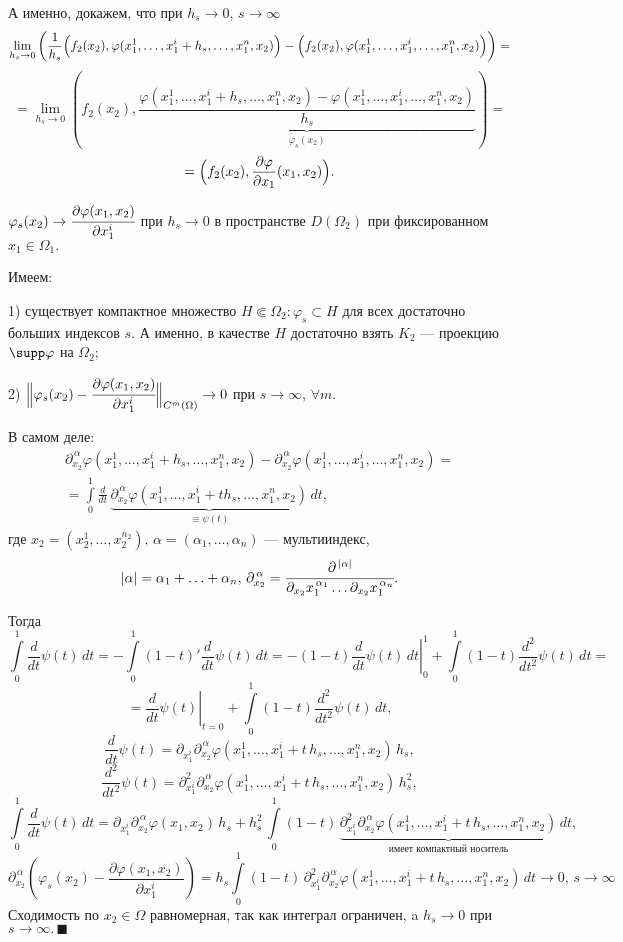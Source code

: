 \documentclass[unicode,12pt,draft]{article}
\begin{document}
А именно, докажем, что при $h_s\to0,\,s\to\infty$
$$\lim_{h_s\to0} \left(\frac1{h_s}\Bigl(f_2(x_2),\varphi(x_1^1,\ldots,x_1^i+h_s,\ldots,x_1^n,x_2)\Bigr)-
\Bigl(f_2(x_2),\varphi(x_1^1,\ldots,x_1^i,\ldots,x_1^n,x_2)\Bigr)\right)=$$
$$=\lim_{h_s\to0}
\left(f_2(x_2),\underbrace{\frac{\varphi(x_1^1,\ldots,x_1^i+h_s,\ldots,x_1^n,x_2)-\varphi(x_1^1,\ldots,x_1^i,\ldots,x_1^n,x_2)}{h_s}}_{\varphi_s(x_2)}\right)=$$
$$=\Bigl(f_2(x_2),\frac{\partial\varphi}{\partial
x_1}(x_1,x_2)\Bigr).$$

$\varphi_s(x_2)\to \cfrac{\partial \varphi(x_1,x_2)}{\partial
x_1^i}$ при $h_s\to0$ в пространстве $D(\Omega_2)$ при
фиксированном $x_1\in\Omega_1.$

Имеем:

1) существует компактное множество $H\Subset\Omega_2\colon
\varphi_s\subset H$ для всех достаточно больших индексов $s$. А
именно, в качестве $H$ достаточно взять $K_2$ --- проекцию $\supp
\varphi$ на $\Omega_2$;

2) $\Bigl\|\varphi_s(x_2)-\cfrac{\partial
\varphi(x_1,x_2)}{\partial x_1^i}\Bigr\|_{C^m(\Omega)}\to0$ при
$s\to\infty,\,\forall m.$

В самом деле:
\begin{multline}
\partial^{\,\alpha}_{x_2}\varphi(x_1^1,\ldots,x_1^i+h_s,\ldots,x_1^n,x_2)-
\partial^{\,\alpha}_{x_2}\varphi(x_1^1,\ldots,x_1^i,\ldots,x_1^n,x_2)=\\=
\int\limits_0^1\frac
d{dt}\,\underbrace{\partial^{\,\alpha}_{x_2}\varphi(x_1^1,\ldots,x_1^i+t
h_s,\ldots,x_1^n,x_2)}_{\equiv \psi(t)}\,dt,
\end{multline}
где
$x_2=(x_2^1,\ldots,x_2^{n_2}),\,\alpha=(\alpha_1,\ldots,\alpha_n)$
--- мультииндекс,
$$|\alpha|=\alpha_1+\ldots+\alpha_n,
\,\partial_{x_2}^{\,\alpha}=\cfrac
{\partial^{\,|\alpha|}}{\partial_{x_2} x_1^{\,\alpha_1}\ldots
\partial_{x_2} x_1^{\,\alpha_n}}.$$

Тогда $$\int\limits_0^1\frac
d{dt}\psi(t)\,dt=-\int\limits_0^1(1-t)'\frac
d{dt}\psi(t)\,dt=-\left.(1-t)\frac d{dt}\psi(t)\,dt\right|_0^1+
\int\limits_0^1(1-t)\frac {d^2}{dt^2}\psi(t)\,dt=$$
$$=\left.\frac d{dt}\psi(t)\right|_{t=0}+
\int\limits_0^1(1-t)\frac {d^2}{dt^2}\psi(t)\,dt,$$
$$\frac d{dt}\psi(t)=\partial_{x_1^i} \partial_{x_2}^{\,\alpha} \varphi (x_1^1,\ldots,x_1^i+t\,h_s,\ldots,x_1^n,x_2)\,h_s,$$
$$\frac {d^2}{dt^2}\psi(t)=\partial^2_{x_1^i} \partial_{x_2}^{\,\alpha} \varphi (x_1^1,\ldots,x_1^i+t\,h_s,\ldots,x_1^n,x_2)\,h_s^2,$$
$$\int\limits_0^1\frac d{dt}\psi(t)\,dt=\partial_{x_1^i} \partial_{x_2}^{\,\alpha} \varphi (x_1,x_2)\,h_s+
h_s^2\,\int\limits_0^1(1-t)\,\underbrace{\partial_{x_1^i}^2
\partial_{x_2}^{\,\alpha} \varphi (x_1^1,\ldots,x_1^i+t\,
h_s,\ldots,x_1^n,x_2)}_{\mbox{имеет компактный носитель}} \,dt,$$
$$\partial_{x_2}^{\,\alpha}\left(\varphi_s (x_2)-\frac{\partial\varphi(x_1,x_2)}{\partial x_1^i}\right)=
h_s\int\limits_0^1(1-t)\,\partial_{x_1^i}^2\partial_{x_2}^{\,\alpha}\varphi(x_1^1,\ldots,x_1^i+t\,h_s,\ldots,x_1^n,x_2)\,dt\to0,
\,s\to\infty$$ Сходимость по $x_2\in\Omega$ равномерная, так как
интеграл ограничен, a $h_s\to0$ при $s\to\infty.\,\blacksquare$
\end{document}
